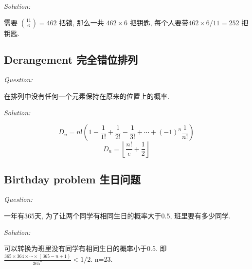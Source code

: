 \documentclass[12pt]{book}
\begin{document}
 \noindent \textit{Solution:} 
 
 需要 $\binom{11}{6}=462$ 把锁, 那么一共 $462\times 6$ 把钥匙, 每个人要带$462\times 6/11=252$ 把钥匙.

  \subsection{Derangement 完全错位排列}
\noindent \textit{Question:}

在排列中没有任何一个元素保持在原来的位置上的概率.

 \noindent \textit{Solution:} 
 
 $$D_n=n!\left(1-\frac{1}{1!}+\frac{1}{2!}-\frac{1}{3!}+\cdots+(-1)^n\frac{1}{n!}\right)$$ 
 $$D_n=\left\lfloor\frac{n!}{e}+\frac{1}{2}\right\rfloor$$

  \subsection{Birthday problem 生日问题}
\noindent \textit{Question:}

一年有365天, 为了让两个同学有相同生日的概率大于0.5, 班里要有多少同学.

 \noindent \textit{Solution:} 
 
 可以转换为班里没有同学有相同生日的概率小于0.5. 即 $\frac{365\times364\times\cdots\times(365-n+1)}{365^n}<1/2$. n=23.
 
 
\end{document}
